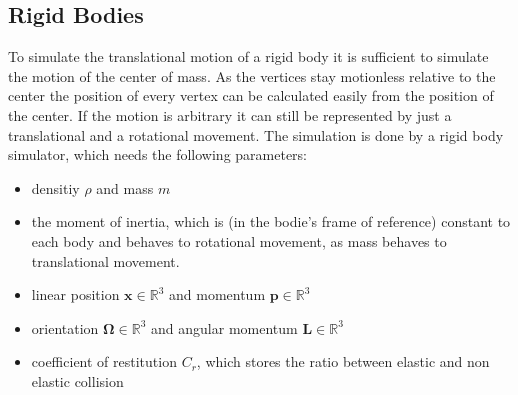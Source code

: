 \documentclass[
	11pt, 
	DIV10,
	a4paper, 
	oneside, 
	headings=normal, 
	captions=tableheading,
	final, 
	numbers=noenddot
]{scrartcl}
\begin{document}
\subsection{Rigid Bodies}
\cite{lecRigidBodies} To simulate the translational motion of a rigid body it is sufficient to simulate the motion of the center of mass. As the vertices stay motionless relative to the center the position of every vertex can be calculated easily from the position of the center. 
If the motion is arbitrary it can still be represented by just a translational and a rotational movement. 
The simulation is done by a rigid body simulator, which needs the following parameters:
\begin{itemize}
	\item densitiy $\rho$ and mass $m$
	\item the moment of inertia, which is (in the bodie's frame of reference) constant to each body and behaves to rotational movement, as mass behaves to translational movement.
	\item linear position $\bm{x}\in\mathbb{R}^{3}$ and momentum $\bm{p}\in\mathbb{R}^{3}$
	\item orientation $\bm \Omega\in\mathbb{R}^{3}$ and angular momentum $\bm L\in\mathbb{R}^{3}$
	\item coefficient of restitution $C_r$, which stores the ratio between elastic and non elastic collision
\end{itemize}
\end{document}
